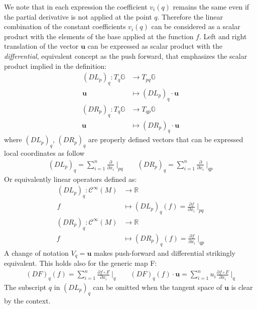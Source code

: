 We note that in each expression the coefficient $v_{i}(q)$ remains the same even if the partial derivative is not applied at the point $q$. Therefore the linear combination of the constant coefficients $v_{i}(q)$ can be considered as a scalar product with the elements of the base applied at the function $f$.
Left and right translation of the vector $\mathbf{u}$ can be expressed as scalar product with the \emph{differential}, equivalent concept as the push forward, that emphasizes the scalar product implied in the definition:
\begin{align*}
(DL_{p})_{q} : T_{q} \mathbb{G}& \longrightarrow  T_{pq}\mathbb{G}    \\
\mathbf{u} &\longmapsto  (DL_{p})_{q} \cdot \mathbf{u} 
\end{align*}
\begin{align*}
(DR_{p})_{q} : T_{q} \mathbb{G} & \longrightarrow  T_{qp}\mathbb{G}    \\
\mathbf{u} &\longmapsto  (DR_{p})_{q} \cdot \mathbf{u}
\end{align*}
where $(DL_{p})_{q}$, $(DR_{p})_{q}$ are properly defined vectors that can be expressed local coordinates as follow
\begin{align*}
(DL_{p})_{q} = \sum_{i=1}^{n}\frac{\partial }{\partial x_{i}} ~\Bigr|_{pq}
\qquad 
(DR_{p})_{q} = \sum_{i=1}^{n} \frac{\partial }{\partial x_{i}} ~\Bigr|_{qp}
\end{align*}
Or equivalently linear operators defined as:
\begin{align*}
(DL_{p})_{q} : \mathcal{C}^{\infty}(M) & \longrightarrow  \mathbb{R}   \\
f &\longmapsto  (DL_{p})_{q} (f) = \frac{\partial f}{\partial x_{i}} ~\Bigr|_{pq} 
\end{align*}
\begin{align*}
(DR_{p})_{q} : \mathcal{C}^{\infty}(M) & \longrightarrow  \mathbb{R} \\
f &\longmapsto  (DR_{p})_{q} (f) = \frac{\partial f}{\partial x_{i}} ~\Bigr|_{qp}
\end{align*}
A change of notation $V_{q} = \mathbf{u}$ makes push-forward and differential strikingly equivalent. This holds also for the generic map F:
\begin{align*}
(DF)_{q} (f)= \sum_{i=1}^{n}\frac{\partial f\circ F}{\partial x_{i}} ~\Bigr|_{q}
\qquad
(DF)_{q} (f)\cdot \mathbf{u}  = \sum_{i=1}^{n} u_{i}\frac{\partial f\circ F}{\partial x_{i}} ~\Bigr|_{q}
\end{align*}
The subscript $q$ in $(DL_{p})_{q}$ can be omitted when the tangent space of $\mathbf{u}$ is clear by the context. 

